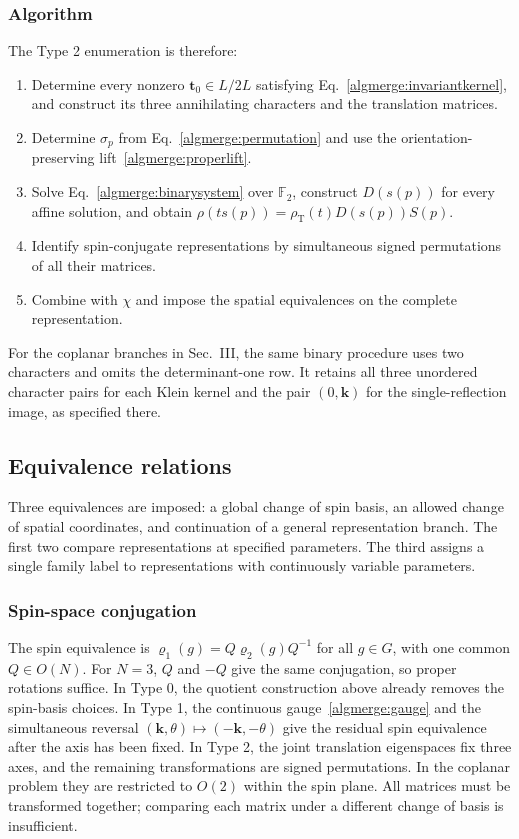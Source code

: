 \subsubsection{Algorithm}

The Type 2 enumeration is therefore:
\begin{enumerate}
\renewcommand{\labelenumi}{(\roman{enumi})}
\item Determine every nonzero $\bm t_0\in L/2L$ satisfying
Eq.~\eqref{algmerge:invariantkernel}, and construct its three
annihilating characters and the translation matrices.
\item Determine $\sigma_p$ from Eq.~\eqref{algmerge:permutation}
and use the orientation-preserving lift~\eqref{algmerge:properlift}.
\item Solve Eq.~\eqref{algmerge:binarysystem} over $\mathbb F_2$,
construct $D(s(p))$ for every affine solution, and obtain
$\rho(t s(p))=\rho_{\mathrm T}(t)D(s(p))S(p)$.
\item Identify spin-conjugate representations by simultaneous
signed permutations of all their matrices.
\item Combine with $\chi$ and impose the spatial equivalences
on the complete representation.
\end{enumerate}
For the coplanar branches in Sec.~III, the same binary procedure
uses two characters and omits the determinant-one row. It retains
all three unordered character pairs for each Klein kernel and the
pair $(0,\bm k)$ for the single-reflection image, as specified there.

\subsection{Equivalence relations}
\label{algmerge:equivalences}

Three equivalences are imposed: a global change of spin basis, an
allowed change of spatial coordinates, and continuation of a general
representation branch. The first two compare representations at
specified parameters. The third assigns a single family label to
representations with continuously variable parameters.

\subsubsection{Spin-space conjugation}

The spin equivalence is $\varrho_1(g)=Q\varrho_2(g)Q^{-1}$ for all
$g\in G$, with one common $Q\in O(N)$. For $N=3$, $Q$ and $-Q$
give the same conjugation, so proper rotations suffice. In Type 0,
the quotient construction above already removes the spin-basis
choices. In Type 1, the continuous gauge~\eqref{algmerge:gauge}
and the simultaneous reversal $(\bm k,\theta)\mapsto(-\bm k,-\theta)$
give the residual spin equivalence after the axis has been fixed.
In Type 2, the joint translation eigenspaces fix three axes, and
the remaining transformations are signed permutations. In the
coplanar problem they are restricted to $O(2)$ within the spin
plane. All matrices must be transformed together; comparing each
matrix under a different change of basis is insufficient.

